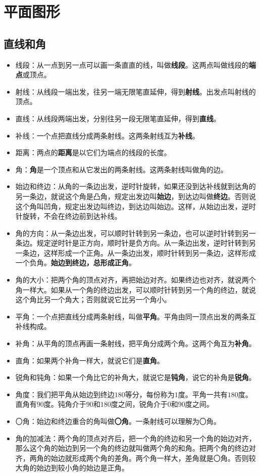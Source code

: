 \documentclass[12pt,UTF8]{ctexart}
\begin{document}
\section{平面图形}

\subsection{直线和角}

\begin{itemize}
\item 线段：从一点到另一点可以画一条直直的线，叫做\textbf{线段}。这两点叫做线段的\textbf{端点}或顶点。
\item 射线：从线段一端出发，往另一端无限笔直延伸，得到\textbf{射线}。出发点叫射线的顶点。
\item 直线：从线段两端出发，分别往另一段无限笔直延伸，得到\textbf{直线}。
\item 补线：一个点把直线分成两条射线。这两条射线互为\textbf{补线}。
\item 距离：两点的\textbf{距离}是以它们为端点的线段的长度。
\item 角：\textbf{角}是一个顶点和从它发出的两条射线。这两条射线叫做角的边。
\item 始边和终边：从角的一条边出发，逆时针旋转，如果还没到达补线就到达角的另一条边，就说这个角是凸角，规定出发边叫\textbf{始边}，到达边叫做\textbf{终边}。否则说这个角叫凹角，规定出发边叫终边，到达边叫始边。这样，从始边出发，逆时针旋转，不会在终边前到达补线。
\item 角的方向：从一条边出发，可以顺时针转到另一条边，也可以逆时针转到另一条边。规定逆时针是正方向，顺时针是负方向。从一条边出发，逆时针转到另一条边，这样形成一个正角。从一条边出发，顺时针转到另一条边，这样形成一个负角。\textbf{始边到终边，总形成正角}。
\item 角的大小：把两个角的顶点对齐，再把始边对齐。如果终边也对齐，就说两个角一样大。如果从一个角的终边出发，可以顺时针转到另一个角的终边，就说这个角比另一个角大；否则就说它比另一个角小。
\item 平角：一个点把直线分成两条射线，叫做\textbf{平角}。平角由同一顶点出发的两条互补线构成。
\item 补角：从平角的顶点再画一条射线，把平角分成两个角。这两个角互为\textbf{补角}。
\item 直角：如果两个补角一样大，就说它们是\textbf{直角}。
\item 锐角和钝角：如果一个角比它的补角大，就说它是\textbf{钝角}，说它的补角是\textbf{锐角}。
\item 角度：我们把平角从始边到终边\( 180 \)等分，每份称为\( 1 \)度。平角一共有\( 180 \)度。直角有\( 90 \)度。钝角介于\( 90 \)和\( 180 \)度之间，锐角介于\( 0 \)和\( 90 \)度之间。
\item 〇角：始边和终边重合的角叫做\textbf{〇角}。一条射线可以理解为〇角。
\item 角的加减法：两个角的顶点对齐后，把一个角的终边和另一个角的始边对齐，那么这个角的始边到另一个角的终边就叫做两个角的和角。把两个角的终边对齐，两角的始边就形成两个角的差角。两个角一样大，差角就是〇角。否则较大角的始边到较小角的始边是正角。
\end{itemize}
\end{document}
